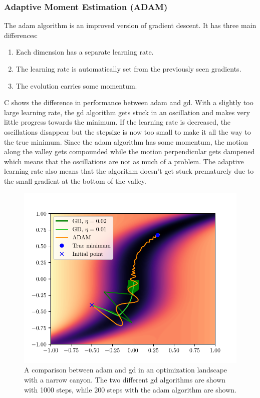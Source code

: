 \subsubsection{Adaptive Moment Estimation (ADAM)}

The \gls{adam} algorithm is an improved version of gradient descent.
It has three main differences:
\begin{enumerate}
	\item Each dimension has a separate learning rate.
	\item The learning rate is automatically set from the previously seen gradients.
	\item The evolution carries some momentum.
\end{enumerate}
C shows the difference in performance between \gls{adam}
and \gls{gd}.
With a slightly too large learning rate, the \gls{gd} algorithm gets stuck in an
oscillation and makes very little progress towards the minimum.
If the learning rate is decreased, the oscillations disappear but the stepsize
is now too small to make it all the way to the true minimum. 
Since the \gls{adam} algorithm has some momentum, the motion along the valley
gets compounded while the motion perpendicular gets dampened which means that
the oscillations are not as much of a problem.
The adaptive learning rate also means that the algorithm doesn't get stuck
prematurely due to the small gradient at the bottom of the valley.
\begin{figure}[htpb]
	\centering
	\includegraphics{chapters/theory/adam_vs_gd_plot.pdf}
	\caption{
		A comparison between \gls{adam} and \gls{gd} in an optimization
		landscape with a narrow canyon. The two different \gls{gd} algorithms
		are shown with 1000 steps, while 200 steps with the \gls{adam} algorithm
		are shown.
	}
	\label{fig:adam_vs_gd}
\end{figure}

